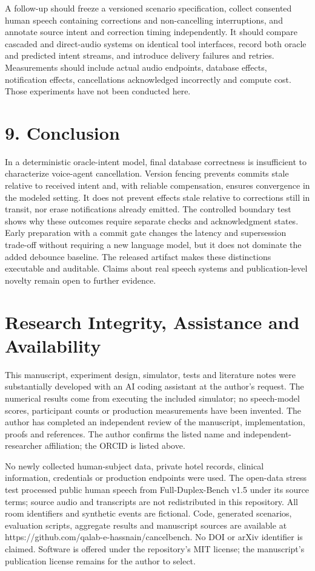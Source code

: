 \documentclass[10pt]{article}
\begin{document}
A follow-up should freeze a versioned scenario specification, collect consented human speech containing corrections and non-cancelling interruptions, and annotate source intent and correction timing independently. It should compare cascaded and direct-audio systems on identical tool interfaces, record both oracle and predicted intent streams, and introduce delivery failures and retries. Measurements should include actual audio endpoints, database effects, notification effects, cancellations acknowledged incorrectly and compute cost. Those experiments have not been conducted here.


\section*{9. Conclusion}

In a deterministic oracle-intent model, final database correctness is insufficient to characterize voice-agent cancellation. Version fencing prevents commits stale relative to received intent and, with reliable compensation, ensures convergence in the modeled setting. It does not prevent effects stale relative to corrections still in transit, nor erase notifications already emitted. The controlled boundary test shows why these outcomes require separate checks and acknowledgment states. Early preparation with a commit gate changes the latency and supersession trade-off without requiring a new language model, but it does not dominate the added debounce baseline. The released artifact makes these distinctions executable and auditable. Claims about real speech systems and publication-level novelty remain open to further evidence.


\section*{Research Integrity, Assistance and Availability}

This manuscript, experiment design, simulator, tests and literature notes were substantially developed with an AI coding assistant at the author's request. The numerical results come from executing the included simulator; no speech-model scores, participant counts or production measurements have been invented. The author has completed an independent review of the manuscript, implementation, proofs and references. The author confirms the listed name and independent-researcher affiliation; the ORCID is listed above.


No newly collected human-subject data, private hotel records, clinical information, credentials or production endpoints were used. The open-data stress test processed public human speech from Full-Duplex-Bench v1.5 under its source terms; source audio and transcripts are not redistributed in this repository. All room identifiers and synthetic events are fictional. Code, generated scenarios, evaluation scripts, aggregate results and manuscript sources are available at https://github.com/qalab-e-hassnain/cancelbench. No DOI or arXiv identifier is claimed. Software is offered under the repository's MIT license; the manuscript's publication license remains for the author to select.
\end{document}
